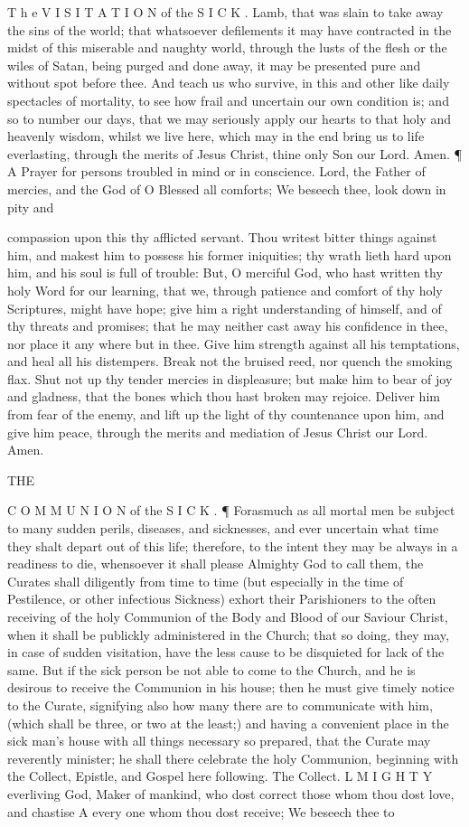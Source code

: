 T h e V I S I T A T I O N of the S I C K . Lamb, that was slain to take away the sins of the world; that whatsoever defilements it may have contracted in the midst of this miserable and naughty world, through the lusts of the flesh or the wiles of Satan, being purged and done away, it may be presented pure and without spot before thee. And teach us who survive, in this and other like daily spectacles of mortality, to see how frail and uncertain our own condition is; and so to number our days, that we may seriously apply our hearts to that holy and heavenly wisdom, whilst we live here, which may in the end bring us to life everlasting, through the merits of Jesus Christ, thine only Son our Lord. Amen. ¶ A Prayer for persons troubled in mind or in conscience. Lord, the Father of mercies, and the God of O Blessed all comforts; We beseech thee, look down in pity and

compassion upon this thy afflicted servant. Thou writest bitter things against him, and makest him to possess his former iniquities; thy wrath lieth hard upon him, and his soul is full of trouble: But, O merciful God, who hast written thy holy Word for our learning, that we, through patience and comfort of thy holy Scriptures, might have hope; give him a right understanding of himself, and of thy threats and promises; that he may neither cast away his confidence in thee, nor place it any where but in thee. Give him strength against all his temptations, and heal all his distempers. Break not the bruised reed, nor quench the smoking flax. Shut not up thy tender mercies in displeasure; but make him to bear of joy and gladness, that the bones which thou hast broken may rejoice. Deliver him from fear of the enemy, and lift up the light of thy countenance upon him, and give him peace, through the merits and mediation of Jesus Christ our Lord. Amen.

THE

C O M M U N I O N of the S I C K . ¶ Forasmuch as all mortal men be subject to many sudden perils, diseases, and sicknesses, and ever uncertain what time they shalt depart out of this life; therefore, to the intent they may be always in a readiness to die, whensoever it shall please Almighty God to call them, the Curates shall diligently from time to time (but especially in the time of Pestilence, or other infectious Sickness) exhort their Parishioners to the often receiving of the holy Communion of the Body and Blood of our Saviour Christ, when it shall be publickly administered in the Church; that so doing, they may, in case of sudden visitation, have the less cause to be disquieted for lack of the same. But if the sick person be not able to come to the Church, and he is desirous to receive the Communion in his house; then he must give timely notice to the Curate, signifying also how many there are to communicate with him, (which shall be three, or two at the least;) and having a convenient place in the sick man’s house with all things necessary so prepared, that the Curate may reverently minister; he shall there celebrate the holy Communion, beginning with the Collect, Epistle, and Gospel here following. The Collect. L M I G H T Y everliving God, Maker of mankind, who dost correct those whom thou dost love, and chastise A every one whom thou dost receive; We beseech thee to

